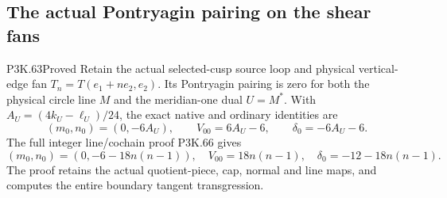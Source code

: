 \subsection{The actual Pontryagin pairing on the shear fans}
\begin{statement}{P3K.63}{Proved}
Retain the actual selected-cusp source loop and physical vertical-edge
fan \(T_n=T(e_1+ne_2,e_2)\). Its Pontryagin pairing is zero for
both the physical circle line \(M\) and the meridian-one dual \(U=M^*\).
With \(A_U=(4k_U-\ell_U)/24\), the exact native and ordinary identities are
\[
(m_0,n_0)=(0,-6A_U),\qquad
V_{00}=6A_U-6,\qquad \delta_0=-6A_U-6.
\]
The full integer line/cochain proof P3K.66 gives
\[
(m_0,n_0)=(0,-6-18n(n-1)),\quad
V_{00}=18n(n-1),\quad \delta_0=-12-18n(n-1).
\]
The proof retains the actual quotient-piece, cap, normal and line
maps, and computes the entire boundary tangent transgression.
\end{statement}
